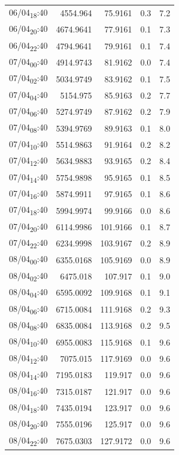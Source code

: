 \documentclass[11pt]{article}
\begin{document}
\begin{center}
\begin{tabular}{lrrrr}
06/04\textsubscript{18}:40 & 4554.964 & 75.9161 & 0.3 & 7.2\\[0pt]
06/04\textsubscript{20}:40 & 4674.9641 & 77.9161 & 0.1 & 7.3\\[0pt]
06/04\textsubscript{22}:40 & 4794.9641 & 79.9161 & 0.1 & 7.4\\[0pt]
07/04\textsubscript{00}:40 & 4914.9743 & 81.9162 & 0.0 & 7.4\\[0pt]
07/04\textsubscript{02}:40 & 5034.9749 & 83.9162 & 0.1 & 7.5\\[0pt]
07/04\textsubscript{04}:40 & 5154.975 & 85.9163 & 0.2 & 7.7\\[0pt]
07/04\textsubscript{06}:40 & 5274.9749 & 87.9162 & 0.2 & 7.9\\[0pt]
07/04\textsubscript{08}:40 & 5394.9769 & 89.9163 & 0.1 & 8.0\\[0pt]
07/04\textsubscript{10}:40 & 5514.9863 & 91.9164 & 0.2 & 8.2\\[0pt]
07/04\textsubscript{12}:40 & 5634.9883 & 93.9165 & 0.2 & 8.4\\[0pt]
07/04\textsubscript{14}:40 & 5754.9898 & 95.9165 & 0.1 & 8.5\\[0pt]
07/04\textsubscript{16}:40 & 5874.9911 & 97.9165 & 0.1 & 8.6\\[0pt]
07/04\textsubscript{18}:40 & 5994.9974 & 99.9166 & 0.0 & 8.6\\[0pt]
07/04\textsubscript{20}:40 & 6114.9986 & 101.9166 & 0.1 & 8.7\\[0pt]
07/04\textsubscript{22}:40 & 6234.9998 & 103.9167 & 0.2 & 8.9\\[0pt]
08/04\textsubscript{00}:40 & 6355.0168 & 105.9169 & 0.0 & 8.9\\[0pt]
08/04\textsubscript{02}:40 & 6475.018 & 107.917 & 0.1 & 9.0\\[0pt]
08/04\textsubscript{04}:40 & 6595.0092 & 109.9168 & 0.1 & 9.1\\[0pt]
08/04\textsubscript{06}:40 & 6715.0084 & 111.9168 & 0.2 & 9.3\\[0pt]
08/04\textsubscript{08}:40 & 6835.0084 & 113.9168 & 0.2 & 9.5\\[0pt]
08/04\textsubscript{10}:40 & 6955.0083 & 115.9168 & 0.1 & 9.6\\[0pt]
08/04\textsubscript{12}:40 & 7075.015 & 117.9169 & 0.0 & 9.6\\[0pt]
08/04\textsubscript{14}:40 & 7195.0183 & 119.917 & 0.0 & 9.6\\[0pt]
08/04\textsubscript{16}:40 & 7315.0187 & 121.917 & 0.0 & 9.6\\[0pt]
08/04\textsubscript{18}:40 & 7435.0194 & 123.917 & 0.0 & 9.6\\[0pt]
08/04\textsubscript{20}:40 & 7555.0196 & 125.917 & 0.0 & 9.6\\[0pt]
08/04\textsubscript{22}:40 & 7675.0303 & 127.9172 & 0.0 & 9.6\\[0pt]
\end{tabular}
\end{center}
\end{document}
